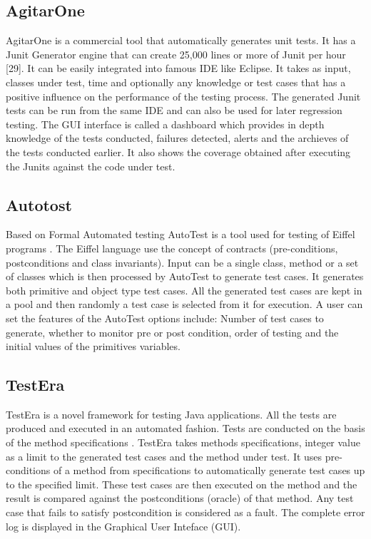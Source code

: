 \subsection{AgitarOne}
AgitarOne is a commercial tool that automatically generates unit tests. It has a Junit Generator engine that can create 25,000 lines or more of Junit per hour [29]. It can be easily integrated into famous IDE like Eclipse. It takes as input, classes under test, time and optionally any knowledge or test cases that has a positive influence on the performance of the testing process. The generated Junit tests can be run from the same IDE and can also be used for later regression testing. The GUI interface is called a dashboard which provides in depth knowledge of the tests conducted, failures detected, alerts and the archieves of the tests conducted earlier. It also shows the coverage obtained after executing the Junits against the code under test.

\subsection{Autotost}
Based on Formal Automated testing AutoTest is a tool used for testing of Eiffel programs \cite{Ciupa2007}. The Eiffel language use the concept of contracts (pre-conditions, postconditions and class invariants). Input can be a single class, method or a set of classes which is then processed by AutoTest to generate test cases. It generates both primitive and object type test cases. All the generated test cases are kept in a pool and then randomly a test case is selected from it for execution. A user can set the features of the AutoTest options include: Number of test cases to generate, whether to monitor pre or post condition, order of testing and the initial values of the primitives variables.

\subsection{TestEra}
TestEra \cite{Khurshid2004} is a novel framework for testing Java applications. All the tests are produced and executed in an automated fashion. Tests are conducted on the basis of the method specifications \cite{Chang1999}. TestEra takes methods specifications, integer value as a limit to the generated test cases and the method under test. It uses pre-conditions of a method from specifications to automatically generate test cases up to the specified limit. These test cases are then executed on the method and the result is compared against the postconditions (oracle) of that method. Any test case that fails to satisfy postcondition is considered as a fault. The complete error log is displayed in the Graphical User Inteface (GUI).

